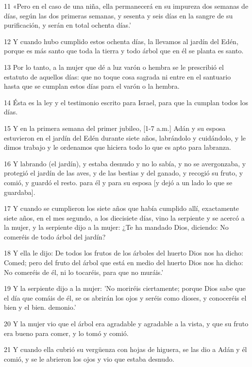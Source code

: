 \par 11 «Pero en el caso de una niña, ella permanecerá en su impureza dos semanas de días, según las dos primeras semanas, y sesenta y seis días en la sangre de su purificación, y serán en total ochenta días.'
\par 12 Y cuando hubo cumplido estos ochenta días, la llevamos al jardín del Edén, porque es más santo que toda la tierra y todo árbol que en él se planta es santo.
\par 13 Por lo tanto, a la mujer que dé a luz varón o hembra se le prescribió el estatuto de aquellos días: que no toque cosa sagrada ni entre en el santuario hasta que se cumplan estos días para el varón o la hembra.
\par 14 Ésta es la ley y el testimonio escrito para Israel, para que la cumplan todos los días.
\par 15 Y en la primera semana del primer jubileo, [1-7 a.m.] Adán y su esposa estuvieron en el jardín del Edén durante siete años, labrándolo y cuidándolo, y le dimos trabajo y le ordenamos que hiciera todo lo que es apto para labranza.
\par 16 Y labrando (el jardín), y estaba desnudo y no lo sabía, y no se avergonzaba, y protegió el jardín de las aves, y de las bestias y del ganado, y recogió su fruto, y comió, y guardó el resto. para él y para su esposa [y dejó a un lado lo que se guardaba].
\par 17 Y cuando se cumplieron los siete años que había cumplido allí, exactamente siete años, en el mes segundo, a los diecisiete días, vino la serpiente y se acercó a la mujer, y la serpiente dijo a la mujer: ¿Te ha mandado Dios, diciendo: No comeréis de todo árbol del jardín?
\par 18 Y ella le dijo: De todos los frutos de los árboles del huerto Dios nos ha dicho: Comed; pero del fruto del árbol que está en medio del huerto Dios nos ha dicho: No comeréis de él, ni lo tocaréis, para que no muráis.'
\par 19 Y la serpiente dijo a la mujer: 'No moriréis ciertamente; porque Dios sabe que el día que comáis de él, se os abrirán los ojos y seréis como dioses, y conoceréis el bien y el bien. demonio.'
\par 20 Y la mujer vio que el árbol era agradable y agradable a la vista, y que su fruto era bueno para comer, y lo tomó y comió.
\par 21 Y cuando ella cubrió su vergüenza con hojas de higuera, se las dio a Adán y él comió, y se le abrieron los ojos y vio que estaba desnudo.
